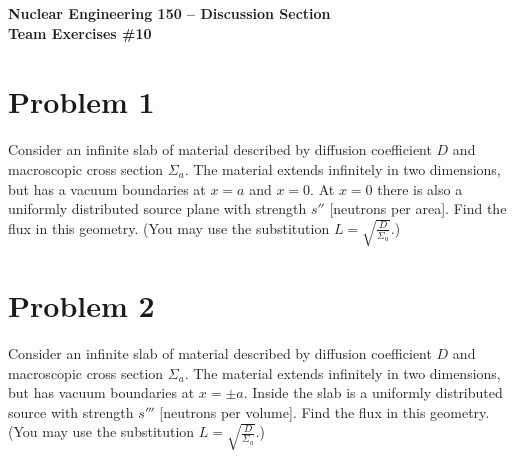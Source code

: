 \documentclass{report}
\begin{document}
\begin{center}
\textbf{\large Nuclear Engineering 150 -- Discussion Section}\\ 
\textbf{Team Exercises \#10}
\end{center}

\section*{Problem 1}

Consider an infinite slab of material described by diffusion coefficient $D$ and macroscopic cross section $\Sigma_a$. The material extends infinitely in two dimensions, but has a vacuum boundaries at $x=a$ and $x=0$. At $x=0$ there is also a uniformly distributed source plane with strength $s''$ [neutrons per area]. Find the flux in this geometry. (You may use the substitution $L = \sqrt{\frac{D}{\Sigma_a}}$.)


\newpage
\section*{Problem 2}

Consider an infinite slab of material described by diffusion coefficient $D$ and macroscopic cross section $\Sigma_a$. The material extends infinitely in two dimensions, but has vacuum boundaries at $x=\pm a$. Inside the slab is a uniformly distributed source with strength $s'''$ [neutrons per volume]. Find the flux in this geometry. (You may use the substitution $L = \sqrt{\frac{D}{\Sigma_a}}$.)
\end{document}
